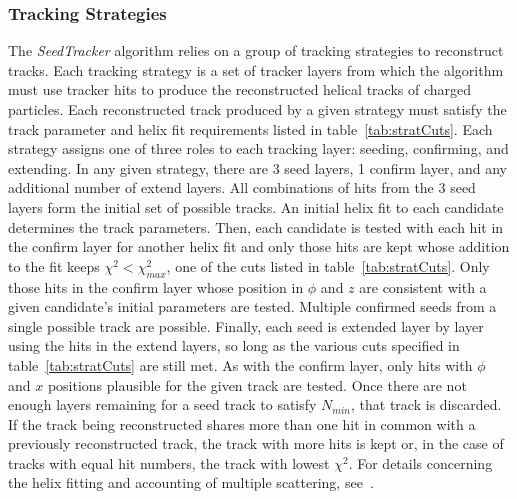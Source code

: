 \subsubsection{Tracking Strategies}
\label{sec:trackingstrategies}
The \textit{SeedTracker} algorithm relies on a group of tracking
strategies to reconstruct tracks.
Each tracking strategy is a set of tracker layers %
from which the algorithm must use tracker hits to
 produce the reconstructed helical tracks of charged particles.
Each reconstructed track produced by a given strategy must satisfy
the track parameter and helix fit requirements listed in table~\ref{tab:stratCuts}.
Each strategy assigns one of three roles to each tracking layer: seeding,
confirming, and extending.
In any given strategy, there are 3 seed layers, 1 confirm layer,
and any additional number of extend layers.
All combinations of hits from the 3 seed layers form the initial 
set of possible tracks.
An initial helix fit to each candidate determines
the track parameters.
Then, each candidate is tested with each hit in the confirm layer
for another helix fit and only those hits are kept whose 
addition to the fit keeps $\chi^{2} < \chi^{2}_{max}$,
one of the cuts listed in table~\ref{tab:stratCuts}.
Only those hits in the confirm layer whose position in $\phi$ and $z$ are
consistent with a given candidate's initial parameters are tested.
Multiple confirmed seeds from a single possible track are possible.
Finally, each seed is extended layer by layer using the hits
in the extend layers, so long as the various cuts specified in table~\ref{tab:stratCuts}
are still met.
As with the confirm layer, only hits with $\phi$ and $x$ positions plausible for
the given track are tested.
Once there are not enough layers remaining for a seed track to satisfy $N_{min}$,
that track is discarded.
If the track being reconstructed shares more than one hit in common with a previously
reconstructed track, the track with more hits is kept or, in the case
of tracks with equal hit numbers, the track with lowest $\chi^{2}$.
For details concerning the helix fitting and accounting of multiple scattering,
see~\cite{Grefe:2014pba}.

